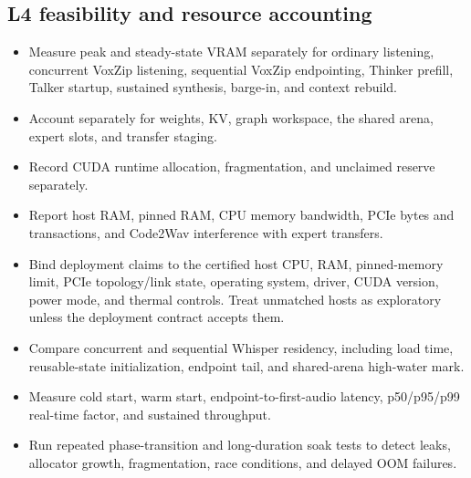 \documentclass[10pt,letterpaper]{article}
\begin{document}
\subsection{L4 feasibility and resource accounting}
\begin{itemize}
    \item Measure peak and steady-state VRAM separately for ordinary listening, concurrent VoxZip listening, sequential VoxZip endpointing, Thinker prefill, Talker startup, sustained synthesis, barge-in, and context rebuild.
    \item Account separately for weights, KV, graph workspace, the shared arena, expert slots, and transfer staging.
    \item Record CUDA runtime allocation, fragmentation, and unclaimed reserve separately.
    \item Report host RAM, pinned RAM, CPU memory bandwidth, PCIe bytes and transactions, and Code2Wav interference with expert transfers.
    \item Bind deployment claims to the certified host CPU, RAM, pinned-memory limit, PCIe topology/link state, operating system, driver, CUDA version, power mode, and thermal controls. Treat unmatched hosts as exploratory unless the deployment contract accepts them.
    \item Compare concurrent and sequential Whisper residency, including load time, reusable-state initialization, endpoint tail, and shared-arena high-water mark.
    \item Measure cold start, warm start, endpoint-to-first-audio latency, p50/p95/p99 real-time factor, and sustained throughput.
    \item Run repeated phase-transition and long-duration soak tests to detect leaks, allocator growth, fragmentation, race conditions, and delayed OOM failures.
\end{itemize}
\end{document}
